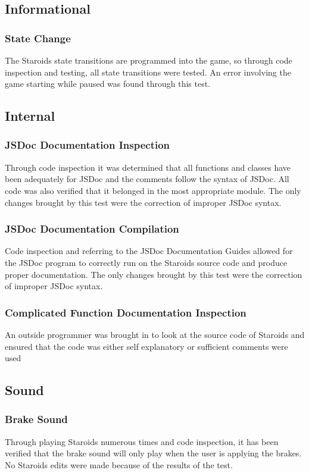 \documentclass[12pt, titlepage]{article}
\begin{document}
\subsection{Informational}

\subsubsection{State Change}
The Staroids state transitions are programmed into the game, so through code inspection and testing, all state transitions were tested. An error involving the game starting while paused was found through this test.

\subsection{Internal}

\subsubsection{JSDoc Documentation Inspection}
Through code inspection it was determined that all functions and classes have been adequately for JSDoc and the comments follow the syntax of JSDoc. All code was also verified that it belonged in the most appropriate module. The only changes brought by this test were the correction of improper JSDoc syntax.
\subsubsection{JSDoc Documentation Compilation}
Code inspection and referring to the JSDoc Documentation Guides allowed for the JSDoc program to correctly run on the Staroids source code and produce proper documentation. The only changes brought by this test were the correction of improper JSDoc syntax.
\subsubsection{Complicated Function Documentation Inspection}
An outside programmer was brought in to look at the source code of Staroids and ensured that the code was either self explanatory or sufficient comments were used

\subsection{Sound}

\subsubsection{Brake Sound}
Through playing Staroids numerous times and code inspection, it has been verified that the brake sound will only play when the user is applying the brakes. No Staroids edits were made because of the results of the test.
\end{document}
